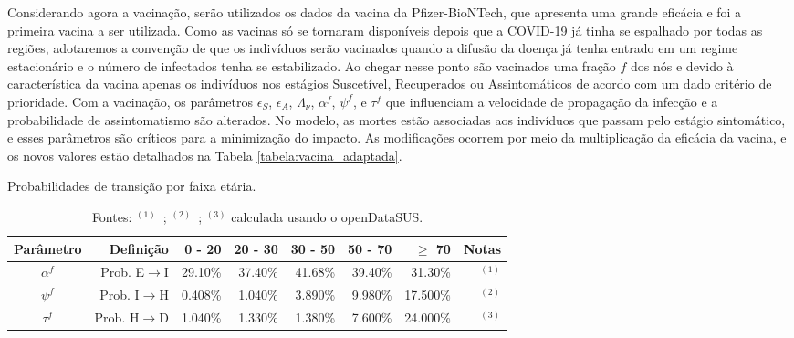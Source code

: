 Considerando agora a vacinação, serão utilizados os dados da vacina da Pfizer-BioNTech, que apresenta uma grande eficácia \cite{HadjHassine2021} e 
foi a primeira vacina a ser utilizada. 
Como as vacinas só se tornaram disponíveis depois que a COVID-19 já tinha se espalhado por todas as regiões, adotaremos a convenção de que os indivíduos serão vacinados quando a difusão da doença já tenha entrado em um regime estacionário e o número de infectados tenha se estabilizado. Ao chegar nesse ponto são vacinados uma fração $f$ dos nós e devido à característica da vacina apenas os indivíduos nos estágios Suscetível, Recuperados ou Assintomáticos de acordo com um dado critério de prioridade. 
Com a vacinação, os parâmetros $\epsilon_S$, $\epsilon_A$, $\Lambda_\nu$, $\alpha^f$, $\psi^f$, e $\tau^f$ que influenciam a velocidade de propagação da infecção e a probabilidade de assintomatismo são alterados. No modelo, as mortes estão associadas aos indivíduos que passam pelo estágio sintomático, e esses parâmetros são críticos para a minimização do impacto. As modificações ocorrem por meio da multiplicação da eficácia da vacina, e os novos valores estão detalhados na Tabela \ref{tabela:vacina_adaptada}.


\begin{table}[H]
    \captionsetup{width=13.5cm}
    \caption{Probabilidades de transição por faixa etária.}
    \centering
    \begin{tabular}{crrrrrrr}
        \toprule
        Parâmetro & Definição & 0 - 20 & 20 - 30 & 30 - 50 & 50 - 70 & \(\geq\) 70 & Notas \\
        \midrule
        \midrule
        \(\alpha^f\) & Prob. E\(\rightarrow\)I & 29.10\% & 37.40\% & 41.68\% & 39.40\% & 31.30\% & \(^{(1)}\) \\
        \(\psi^f\) & Prob. I\(\rightarrow\)H & 0.408\% & 1.040\% & 3.890\% & 9.980\% & 17.500\% & \(^{(2)}\) \\
        \(\tau^f\) & Prob. H\(\rightarrow\)D & 1.040\% & 1.330\% & 1.380\% & 7.600\% & 24.000\% & \(^{(3)}\) \\
        \bottomrule
    \end{tabular}
    \caption*{Fontes: \(^{(1)}\)~\cite{Jung2020}; \(^{(2)}\)~\cite{RochaFilho2022}; \(^{(3)}\) calculada usando o openDataSUS.}
    \label{tabela:probabilidades_transicao_adaptada}
\end{table}


